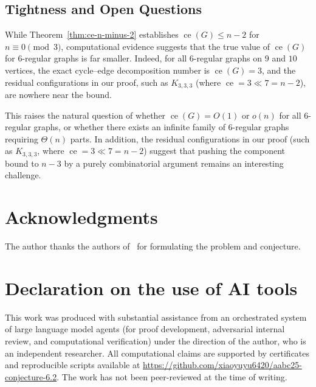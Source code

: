 \documentclass[11pt,reqno]{amsart}
\theoremstyle{definition}
\theoremstyle{remark}
\DeclareMathOperator{\ce}{ce}
\begin{document}
\subsection{Tightness and Open Questions}
While Theorem~\ref{thm:ce-n-minus-2} establishes $\ce(G) \le n-2$ for $n \equiv 0 \pmod 3$, computational evidence suggests that the true value of $\ce(G)$ for $6$-regular graphs is far smaller. Indeed, for all 6-regular graphs on $9$ and $10$ vertices, the exact cycle--edge decomposition number is $\ce(G) = 3$, and the residual configurations in our proof, such as $K_{3,3,3}$ (where $\ce = 3 \ll 7 = n-2$), are nowhere near the bound. 

This raises the natural question of whether $\ce(G) = O(1)$ or $o(n)$ for all 6-regular graphs, or whether there exists an infinite family of 6-regular graphs requiring $\Theta(n)$ parts. In addition, the residual configurations in our proof (such as $K_{3,3,3}$, where $\ce = 3 \ll 7 = n-2$) suggest that pushing the component bound to $n-3$ by a purely combinatorial argument remains an interesting challenge.

\section*{Acknowledgments}
The author thanks the authors of~\cite{AABC25} for formulating the problem and conjecture.

\section*{Declaration on the use of AI tools}
This work was produced with substantial assistance from an orchestrated system of large language model agents (for proof development, adversarial internal review, and computational verification) under the direction of the author, who is an independent researcher. All computational claims are supported by certificates and reproducible scripts available at \url{https://github.com/xiaoyuyu6420/aabc25-conjecture-6.2}. The work has not been peer-reviewed at the time of writing.
\end{document}
